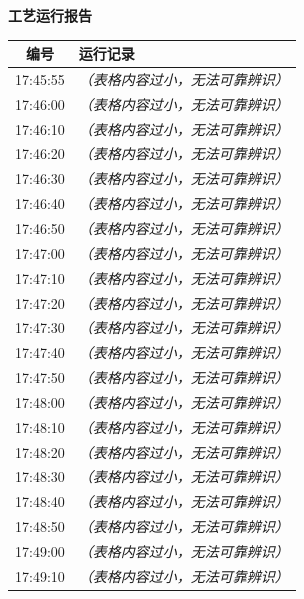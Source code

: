 \documentclass[UTF8,10pt,a4paper,fontset=fandol]{ctexart}
\begin{document}
\vspace{12pt}

\begin{center}
\begin{minipage}[t]{0.47\textwidth}
\centering
\textbf{工艺运行报告}

\vspace{2pt}
\begin{tabularx}{\linewidth}{|c|X|}
\hline
编号 & 运行记录 \\ \hline
17:45:55 & \textit{（表格内容过小，无法可靠辨识）} \\ \hline
17:46:00 & \textit{（表格内容过小，无法可靠辨识）} \\ \hline
17:46:10 & \textit{（表格内容过小，无法可靠辨识）} \\ \hline
17:46:20 & \textit{（表格内容过小，无法可靠辨识）} \\ \hline
17:46:30 & \textit{（表格内容过小，无法可靠辨识）} \\ \hline
17:46:40 & \textit{（表格内容过小，无法可靠辨识）} \\ \hline
17:46:50 & \textit{（表格内容过小，无法可靠辨识）} \\ \hline
17:47:00 & \textit{（表格内容过小，无法可靠辨识）} \\ \hline
17:47:10 & \textit{（表格内容过小，无法可靠辨识）} \\ \hline
17:47:20 & \textit{（表格内容过小，无法可靠辨识）} \\ \hline
17:47:30 & \textit{（表格内容过小，无法可靠辨识）} \\ \hline
17:47:40 & \textit{（表格内容过小，无法可靠辨识）} \\ \hline
17:47:50 & \textit{（表格内容过小，无法可靠辨识）} \\ \hline
17:48:00 & \textit{（表格内容过小，无法可靠辨识）} \\ \hline
17:48:10 & \textit{（表格内容过小，无法可靠辨识）} \\ \hline
17:48:20 & \textit{（表格内容过小，无法可靠辨识）} \\ \hline
17:48:30 & \textit{（表格内容过小，无法可靠辨识）} \\ \hline
17:48:40 & \textit{（表格内容过小，无法可靠辨识）} \\ \hline
17:48:50 & \textit{（表格内容过小，无法可靠辨识）} \\ \hline
17:49:00 & \textit{（表格内容过小，无法可靠辨识）} \\ \hline
17:49:10 & \textit{（表格内容过小，无法可靠辨识）} \\ \hline

\end{tabularx}
\end{minipage}
\end{center}
\end{document}

